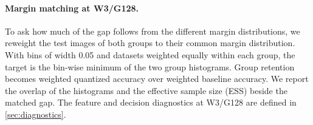 \paragraph{Margin matching at W3/G128.}
To ask how much of the gap follows from the different margin distributions, we reweight the test images of both groups to their common margin distribution.
With bins of width 0.05 and datasets weighted equally within each group, the target is the bin-wise minimum of the two group histograms.
Group retention becomes weighted quantized accuracy over weighted baseline accuracy.
We report the overlap of the histograms and the effective sample size (ESS) beside the matched gap.
The feature and decision diagnostics at W3/G128 are defined in \cref{sec:diagnostics}.
